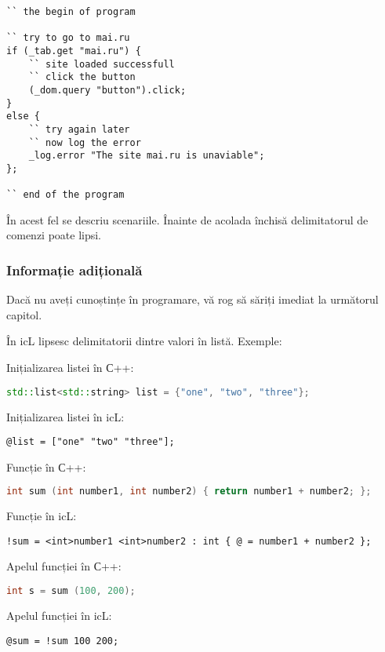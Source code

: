 \begin{lstlisting}[caption=Cod cu spații,label=readable]
`` the begin of program

`` try to go to mai.ru
if (_tab.get "mai.ru") {
	`` site loaded successfull
	`` click the button
	(_dom.query "button").click;
}
else {
	`` try again later
	`` now log the error
	_log.error "The site mai.ru is unaviable";
};

`` end of the program
\end{lstlisting}

În acest fel se descriu scenariile. Înainte de acolada închisă delimitatorul de comenzi poate lipsi.

\subsubsection{Informație adițională}

Dacă nu aveți cunoștințe în programare, vă rog să săriți imediat la următorul capitol.

În icL lipsesc delimitatorii dintre valori în listă. Exemple:

\begin{icItems}
	\item Inițializarea listei în С++:
\begin{lstlisting}[numbers=none, language=C++]
std::list<std::string> list = {"one", "two", "three"};
\end{lstlisting}
	Inițializarea listei în icL:
\begin{lstlisting}[numbers=none]
@list = ["one" "two" "three"];
\end{lstlisting}
	\item Funcție în С++:
\begin{lstlisting}[numbers=none, language=C++]
int sum (int number1, int number2) { return number1 + number2; };
\end{lstlisting}
	Funcție în icL:
\begin{lstlisting}[numbers=none]
!sum = <int>number1 <int>number2 : int { @ = number1 + number2 };
\end{lstlisting}
	\item Apelul funcției în С++:
\begin{lstlisting}[numbers=none, language=C++]
int s = sum (100, 200);
\end{lstlisting}
	Apelul funcției în icL:
\begin{lstlisting}[numbers=none]
@sum = !sum 100 200;
\end{lstlisting}
\end{icItems}
